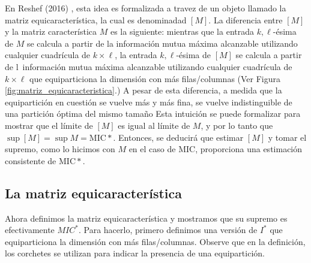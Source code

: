         En Reshef (2016) \cite{Reshef2016}, esta idea es formalizada a travez de un objeto llamado la matriz equicaracter\'istica, la cual es denominadad $[M]$. La diferencia entre $[M]$ y la matriz caracter\'istica $M$ es la siguiente: mientras que la entrada $k, \ell$-\'esima de $M$ se calcula a partir de la informaci\'on mutua m\'axima alcanzable utilizando cualquier cuadr\'icula de $k\times\ell$, la entrada $k, \ell$-\'esima de $[M]$ se calcula a partir de l\ informaci\'on mutua m\'axima alcanzable utilizando cualquier cuadr\'icula de $k\times\ell$ que equiparticiona la dimensi\'on con m\'as filas/columnas (Ver Figura \ref{fig:matriz_equicaracteristica}.) A pesar de esta diferencia, a medida que la equipartici\'on en cuesti\'on se vuelve m\'as y m\'as fina, se vuelve indistinguible de una partici\'on \'optima del mismo tama\~no Esta intuici\'on se puede formalizar para mostrar que el l\'imite de $[M]$ es igual al l\'imite de $M$, y por lo tanto que $\sup [M]=\sup M=\mathrm{MIC}*$. Entonces, se deducir\'a que estimar $[M]$ y tomar el supremo, como lo hicimos con $M$ en el caso de MIC, proporciona una estimaci\'on consistente de $\mathrm{MIC}*$.
    
        \subsection{La matriz equicaracter\'istica} 
    
        Ahora definimos la matriz equicaracter\'istica y mostramos que su supremo es efectivamente $MIC^*$. Para hacerlo, primero definimos una versi\'on de $I^*$ que equiparticiona la dimensi\'on con m\'as filas/columnas. Observe que en la definici\'on, los corchetes se utilizan para indicar la presencia de una equipartici\'on.
    
